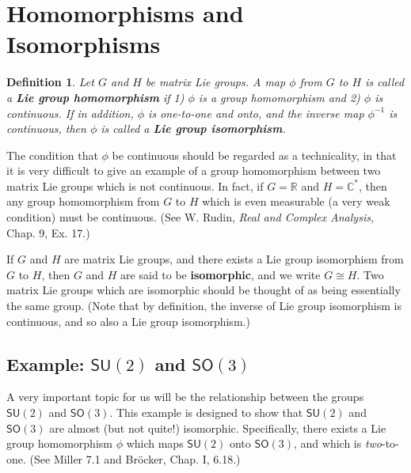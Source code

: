 \documentclass{amsbook}
\theoremstyle{plain}
\newtheorem{definition}[theorem]{Definition}
\numberwithin{equation}{chapter}
\numberwithin{theorem}{chapter}
\begin{document}
\section{Homomorphisms and Isomorphisms}

\begin{definition}
\label{matrix.homomorphism}Let $G$ and $H$ be matrix Lie groups. A map $\phi$
from $G$ to $H$ is called a \textbf{Lie group homomorphism} if 1) $\phi$ is a
group homomorphism and 2) $\phi$ is continuous. If in addition, $\phi$ is
one-to-one and onto, and the inverse map $\phi^{-1}$ is continuous, then
$\phi$ is called a \textbf{Lie group isomorphism}.
\end{definition}

The condition that $\phi$ be continuous should be regarded as a technicality,
in that it is very difficult to give an example of a group homomorphism
between two matrix Lie groups which is not continuous. In fact, if
$G=\mathbb{R}$ and $H=\mathbb{C}^{\ast}$, then any group homomorphism from $G$
to $H$ which is even measurable (a very weak condition) must be continuous.
(See W. Rudin, \textit{Real and Complex Analysis,} Chap. 9, Ex. 17.)

If $G$ and $H$ are matrix Lie groups, and there exists a Lie group isomorphism
from $G$ to $H$, then $G$ and $H$ are said to be \textbf{isomorphic}, and we
write $G\cong H$. Two matrix Lie groups which are isomorphic should be thought
of as being essentially the same group. (Note that by definition, the inverse
of Lie group isomorphism is continuous, and so also a Lie group isomorphism.)

\subsection{Example: $\mathsf{SU}(2)$ and $\mathsf{SO}(3)$}

A very important topic for us will be the relationship between the groups
$\mathsf{SU}(2)$ and $\mathsf{SO}(3)$. This example is designed to show that
$\mathsf{SU}(2)$ and $\mathsf{SO}(3)$ are almost (but not quite!) isomorphic.
Specifically, there exists a Lie group homomorphism $\phi$ which maps
$\mathsf{SU}(2)$ onto $\mathsf{SO}(3)$, and which is \textit{two}-to-one. (See
Miller 7.1 and Br\"ocker, Chap. I, 6.18.)
\end{document}
